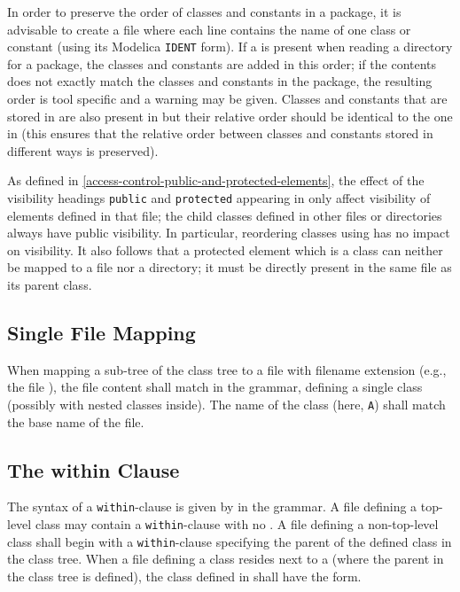 In order to preserve the order of classes and constants in a package, it is advisable to create a file  where each line contains the name of one class or constant (using its Modelica \lstinline!IDENT! form).
If a  is present when reading a directory for a package, the classes and constants are added in this order; if the contents does not exactly match the classes and constants in the package, the resulting order is tool specific and a warning may be given.
Classes and constants that are stored in  are also present in  but their relative order should be identical to the one in  (this ensures that the relative order between classes and constants stored in different ways is preserved).

As defined in \cref{access-control-public-and-protected-elements}, the effect of the visibility headings \lstinline!public! and \lstinline!protected! appearing in  only affect visibility of elements defined in that file; the child classes defined in other files or directories always have public visibility.
In particular, reordering classes using  has no impact on visibility.
It also follows that a protected element which is a class can neither be mapped to a file nor a directory; it must be directly present in the same file as its parent class.


\subsection{Single File Mapping}\label{mapping-a-package-class-hierarchy-into-a-single-file-nonstructured-entity}\label{single-file-mapping}

When mapping a sub-tree of the class tree to a file with filename extension  (e.g., the file ), the file content shall match  in the grammar, defining a single class (possibly with nested classes inside).
The name of the class (here, \lstinline!A!) shall match the base name of the file.


\subsection{The within Clause}\label{the-within-clause}

The syntax of a \lstinline!within!-clause is given by  in the grammar.
A file defining a top-level class may contain a \lstinline!within!-clause with no .
A file defining a non-top-level class shall begin with a \lstinline!within!-clause specifying the parent of the defined class in the class tree.
When a file defining a class resides next to a  (where the parent in the class tree is defined), the class defined in  shall have the  form.


